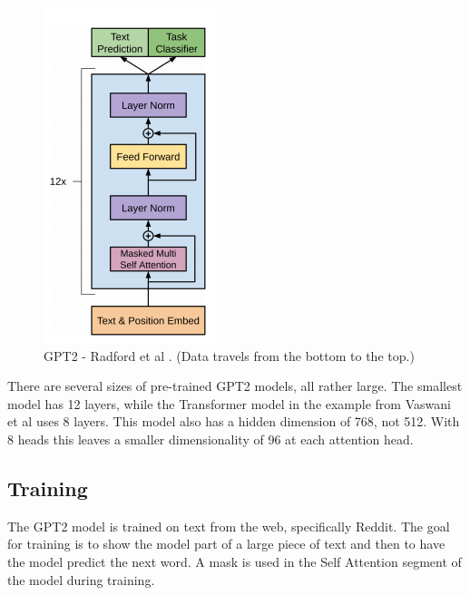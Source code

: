 \begin{figure}[H]
	\begin{center}
		
		
		\includegraphics[scale=3.0]{diagram-mat05}
	\end{center}
	\caption[Generative Pre-Training 2 ]{GPT2 - Radford et al \cite{radford2018improving}. (Data travels from the bottom to the top.)}
	

\end{figure}

There are several sizes of pre-trained GPT2 models, all rather large. The smallest model has 12 layers, while the Transformer model in the example from Vaswani et al \cite{Vaswani2017AttentionIA} uses 8 layers. This model also has a hidden dimension of 768, not 512. With 8 heads this leaves a smaller dimensionality of 96 at each attention head. 



\subsection{Training}

The GPT2 model is trained on text from the web, specifically Reddit. The goal for training is to show the model part of a large piece of text and then to have the model predict the next word. A mask is used in the Self Attention segment of the model during training.


